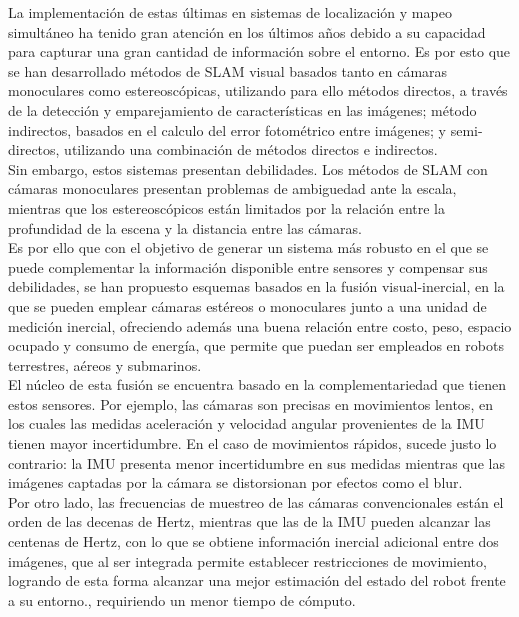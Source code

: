 La implementación de estas últimas en sistemas de localización y mapeo simultáneo ha tenido gran atención en los últimos años debido a su capacidad para capturar una gran cantidad de información sobre el entorno. Es por esto que se han desarrollado métodos de SLAM visual basados tanto en cámaras monoculares como estereoscópicas, utilizando para ello métodos directos, a través de la detección y emparejamiento de características en las imágenes; método indirectos, basados en el calculo del error fotométrico entre imágenes; y semi-directos, utilizando una combinación de métodos directos e indirectos.\\

Sin embargo, estos sistemas presentan debilidades. Los métodos de SLAM con cámaras monoculares presentan problemas de ambiguedad ante la escala, mientras que  los estereoscópicos están limitados por la relación entre la profundidad de la escena y la distancia entre las cámaras. \\

Es por ello que con el objetivo de generar un sistema más robusto en el que se puede complementar la información disponible entre sensores y compensar sus debilidades, se han propuesto esquemas basados en la fusión visual-inercial, en la que se pueden emplear cámaras estéreos o monoculares junto a una unidad de medición inercial, ofreciendo además una buena relación entre costo, peso, espacio ocupado y consumo de energía, que permite que puedan ser empleados en robots terrestres, aéreos y submarinos.\\

El núcleo de esta fusión se encuentra basado en la complementariedad que tienen estos sensores. Por ejemplo, las cámaras son precisas en movimientos lentos, en los cuales las medidas aceleración y velocidad angular provenientes de la IMU tienen mayor incertidumbre. En el caso de movimientos rápidos, sucede justo lo contrario: la IMU presenta menor incertidumbre en sus medidas mientras que las imágenes captadas por la cámara se distorsionan por efectos como el blur. \\

Por otro lado,  las frecuencias de muestreo de las cámaras convencionales están el orden de las decenas de Hertz, mientras que las de la IMU pueden alcanzar las centenas de Hertz, con lo que se  obtiene información inercial adicional entre dos imágenes, que al ser integrada permite establecer restricciones de movimiento,  logrando de esta forma alcanzar una mejor estimación del estado del robot frente a su entorno., requiriendo un menor tiempo de cómputo. \\
